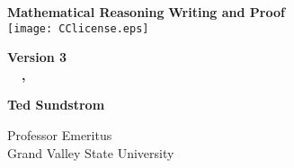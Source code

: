 \begin{titlepage}
\vspace*{0.5in}
\begin{center}
\fontsize{28.8}{12}\selectfont \textbf{Mathematical Reasoning}
\smallskip
\fontsize{23}{12}\selectfont \textbf{Writing and Proof}\\
\vspace{0.3125in}
\texttt{[image: CClicense.eps]}

\vspace{0.3in}
\textbf{\large{Version 3}} \\
\textbf{\large{\monthname~~\the\day, \the\year}}

\vspace{1.0in}
\textbf{\huge{Ted Sundstrom}}



\smallskip
\Large{Professor Emeritus\\Grand Valley State University}
\end{center}


\end{titlepage}


\endinput
